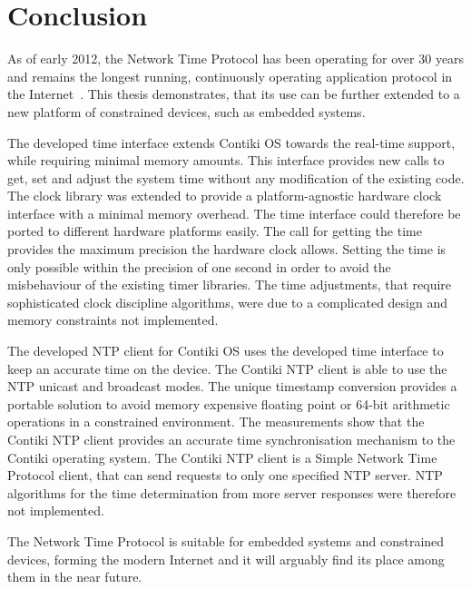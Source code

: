 






\chapter{Conclusion}
As of early 2012, the Network Time Protocol has been operating for over 30 years
and remains the longest running, continuously operating application
protocol in the Internet~\cite{ntp-y2k}.
This thesis demonstrates, that its use can be further extended to a new platform of constrained devices,
such as embedded systems.

The developed time interface extends Contiki OS towards the real-time support,
while requiring minimal memory amounts.
This interface provides new calls to get, set and adjust the system time without any modification
of the existing code.
The clock library was extended to provide a platform-agnostic hardware clock interface
with a minimal memory overhead.
The time interface could therefore be ported to different hardware platforms easily.
The call for getting the time provides the maximum precision the hardware clock allows.
Setting the time is only possible within the precision of one second in order to avoid
the misbehaviour of the existing timer libraries.
The time adjustments, that require sophisticated clock discipline algorithms,
were due to a complicated design and memory constraints not implemented.

The developed NTP client for Contiki OS uses the developed time interface to keep an accurate time on the device.
The Contiki NTP client is able to use the NTP unicast and broadcast modes.
The unique timestamp conversion provides a portable solution to avoid
memory expensive floating point or 64-bit arithmetic operations in a constrained environment.
The measurements show that the Contiki NTP client provides an accurate time
synchronisation mechanism to the Contiki operating system.
The Contiki NTP client is a Simple Network Time Protocol client,
that can send requests to only one specified NTP server.
NTP algorithms for the time determination from more server responses were therefore not implemented.

The Network Time Protocol is suitable for embedded systems and constrained devices,
forming the modern Internet and it will arguably find its place among them in the near future.
